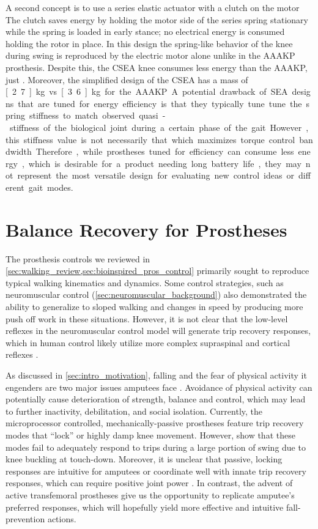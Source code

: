 A second concept is to use a series elastic actuator with a clutch on the motor
\citep{rouse2014clutchable, rouse2015design} The clutch saves energy by holding
the motor side of the series spring stationary while the spring is loaded in
early stance; no electrical energy is consumed holding the rotor in place. In
this design the spring-like behavior of the knee during swing is reproduced by
the electric motor alone unlike in the AAAKP prosthesis. Despite this, the
CSEA knee consumes less energy than the AAAKP, just .
Moreover, the simplified design of the CSEA has a mass of \unit[2.7]{kg} vs
\unit[3.6]{kg} for the AAAKP.

A potential drawback of SEA designs that are tuned for energy efficiency is that
they typically tune tune the spring stiffness to match observed quasi-stiffness
of the biological joint during a certain phase of the gait. However, this
stiffness value is not necessarily that which maximizes torque control
bandwidth. Therefore, while prostheses tuned for efficiency can consume less
energy, which is desirable for a product needing long battery life, they may
not represent the most versatile design for evaluating new control ideas or
different gait modes. 

\section{Balance Recovery for Prostheses} 
The prosthesis controls we reviewed in
\cref{sec:walking_review,sec:bioinspired_pros_control} primarily sought to
reproduce typical walking kinematics and dynamics. Some control strategies, such
as neuromuscular control (\cref{sec:neuromuscular_background}) also demonstrated
the ability to generalize to sloped walking and changes in speed by producing
more push off work in these situations\citep{eilenberg2010control,
markowitz2011speed}. However, it is not clear that the low-level reflexes in the
neuromuscular control model will generate trip recovery responses, which in
human control likely utilize more complex supraspinal and cortical reflexes
\citep{eng1994strategies, schillings2000muscular, hofstad2009evidence}.

As discussed in \cref{sec:intro_motivation}, falling and the fear of physical
activity it engenders are two major issues amputees face
\citep{miller2001prevalence}. Avoidance of physical activity can potentially
cause deterioration of strength, balance and control, which may lead to further
inactivity, debilitation, and social isolation. Currently, the microprocessor
controlled, mechanically-passive prostheses feature trip recovery modes
that ``lock'' or highly damp knee movement. However,
\citet{bellmann2010comparative} show that these modes fail to adequately respond
to trips during a large portion of swing due to knee buckling at touch-down.
Moreover, it is unclear that passive, locking responses are intuitive for
amputees or coordinate well with innate trip recovery responses, which can
require positive joint power \citep{cordero2005energy}. In contrast, the advent
of active transfemoral prostheses give us the opportunity to replicate amputee's
preferred responses, which will hopefully yield more effective and intuitive
fall-prevention actions.

